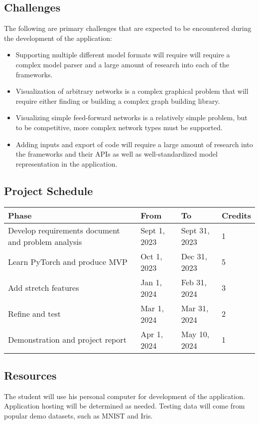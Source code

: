 \documentclass[letterpaper, 12pt]{report}
\begin{document}
\subsection*{Challenges}
The following are primary challenges that are expected to be encountered during the development of the application:
\begin{itemize}
    \item Supporting multiple different model formats will require will require a complex model parser and a large amount of research into each of the frameworks.
    \item Visualization of arbitrary networks is a complex graphical problem that will require either finding or building a complex graph building library.
    \item Visualizing simple feed-forward networks is a relatively simple problem, but to be competitive, more complex network types must be supported.
    \item Adding inputs and export of code will require a large amount of research into the frameworks and their APIs as well as well-standardized model representation in the application.
\end{itemize}

\subsection*{Project Schedule}
\begin{center}
    \begin{tabular}{ |m{16em}|m{7em}|m{7em}|m{4em}| }
        \hline
        \textbf{Phase} & \textbf{From} & \textbf{To} & \textbf{Credits} \\  
        \hline
        Develop requirements document and problem analysis & Sept 1, 2023 & Sept 31, 2023 & 1 \\
        \hline
        Learn PyTorch and produce MVP & Oct 1, 2023 & Dec 31, 2023 & 5 \\
        \hline
        Add stretch features & Jan 1, 2024 & Feb 31, 2024 & 3 \\
        \hline
        Refine and test & Mar 1, 2024 & Mar 31, 2024 & 2 \\
        \hline
        Demonstration and project report & Apr 1, 2024 & May 10, 2024 & 1 \\
        \hline
    \end{tabular}
\end{center}

\subsection*{Resources}
The student will use his personal computer for development of the application. Application hosting will be determined as needed. Testing data will come from popular demo datasets, such as MNIST and Iris. 
\end{document}
